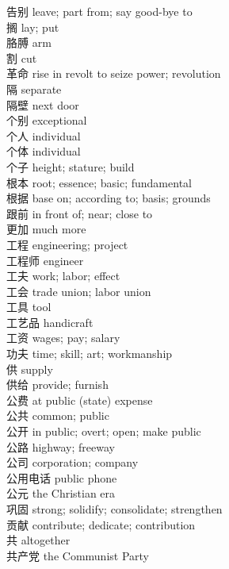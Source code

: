 告别 \quad leave; part from; say good-bye to\\
搁 \quad lay; put\\
胳膊 \quad arm\\
割 \quad cut\\
革命 \quad rise in revolt to seize power; revolution\\
隔 \quad separate\\
隔壁 \quad next door\\
个别 \quad exceptional\\
个人 \quad individual\\
个体 \quad individual\\
个子 \quad height; stature; build\\
根本 \quad root; essence; basic; fundamental\\
根据 \quad base on; according to; basis; grounds\\
跟前 \quad in front of; near; close to\\
更加 \quad much more\\
工程 \quad engineering; project\\
工程师 \quad engineer\\
工夫 \quad work; labor; effect\\
工会 \quad trade union; labor union\\
工具 \quad tool\\
工艺品 \quad handicraft\\
工资 \quad wages; pay; salary\\
功夫 \quad time; skill; art; workmanship\\
供 \quad supply\\
供给 \quad provide; furnish\\
公费 \quad at public (state) expense\\
公共 \quad common; public\\
公开 \quad in public; overt; open; make public\\
公路 \quad highway; freeway\\
公司 \quad corporation; company\\
公用电话 \quad public phone\\
公元 \quad the Christian era\\
巩固 \quad strong; solidify; consolidate; strengthen\\
贡献 \quad contribute; dedicate; contribution\\
共 \quad altogether\\
共产党 \quad the Communist Party\\
